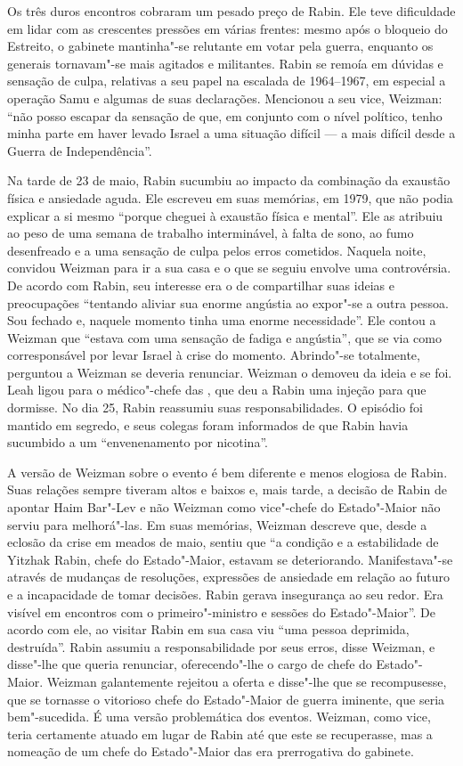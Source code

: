 Os três duros encontros cobraram um pesado preço de Rabin. Ele teve
dificuldade em lidar com as crescentes pressões em várias frentes: mesmo
após o bloqueio do Estreito, o gabinete mantinha"-se relutante em votar
pela guerra, enquanto os generais tornavam"-se mais agitados e
militantes. Rabin se remoía em dúvidas e sensação de culpa,
relativas a seu papel na escalada de 1964--1967, em especial a operação
Samu e algumas de suas declarações. Mencionou a seu vice,
Weizman: ``não posso escapar da sensação de que, em conjunto com o nível
político, tenho minha parte em haver levado Israel a uma situação
difícil --- a mais difícil desde a Guerra de Independência''.

Na tarde de 23 de maio, Rabin sucumbiu ao impacto da combinação da
exaustão física e ansiedade aguda. Ele escreveu em suas memórias, em 1979,
que não podia explicar a si mesmo ``porque cheguei à exaustão física e
mental''. Ele as atribuiu ao peso de uma semana de trabalho
interminável, à falta de sono, ao fumo desenfreado e a uma sensação de
culpa pelos erros cometidos. Naquela noite, convidou Weizman para ir a
sua casa e o que se seguiu envolve uma controvérsia. De acordo
com Rabin, seu interesse era o de compartilhar suas ideias e
preocupações ``tentando aliviar sua enorme angústia ao expor"-se a outra
pessoa. Sou fechado e, naquele momento tinha uma enorme necessidade''.
Ele contou a Weizman que ``estava com uma sensação de fadiga e
angústia'', que se via como corresponsável por levar Israel à crise do
momento. Abrindo"-se totalmente, perguntou a Weizman se deveria renunciar.
Weizman o demoveu da ideia e se foi. Leah ligou para o médico"-chefe das
, que deu a Rabin uma injeção para que dormisse. No dia 25, Rabin
reassumiu suas responsabilidades. O episódio foi mantido em segredo, e
seus colegas foram informados de que Rabin havia sucumbido a um
``envenenamento por nicotina''.

A versão de Weizman sobre o evento é bem diferente e menos elogiosa de
Rabin. Suas relações sempre tiveram altos e baixos e, mais tarde, a
decisão de Rabin de apontar Haim Bar"-Lev e não Weizman como vice"-chefe
do Estado"-Maior não serviu para melhorá"-las. Em suas memórias, Weizman
descreve que, desde a eclosão da crise em meados de maio, sentiu que
``a condição e a estabilidade de Yitzhak Rabin, chefe do Estado"-Maior,
estavam se deteriorando. Manifestava"-se através de mudanças de resoluções,
expressões de ansiedade em relação ao futuro e a incapacidade de tomar
decisões. Rabin gerava insegurança ao seu redor. Era visível em
encontros com o primeiro"-ministro e sessões do Estado"-Maior''. De acordo
com ele, ao visitar Rabin em sua casa viu ``uma pessoa
deprimida, destruída''. Rabin assumiu a responsabilidade por seus erros,
disse Weizman, e disse"-lhe que queria renunciar, oferecendo"-lhe o cargo
de chefe do Estado"-Maior. Weizman galantemente rejeitou a oferta e
disse"-lhe que se recompusesse, que se tornasse o vitorioso chefe do
Estado"-Maior de guerra iminente, que seria bem"-sucedida. É uma versão
problemática dos eventos. Weizman, como vice, teria certamente atuado em
lugar de Rabin até que este se recuperasse, mas a nomeação de um chefe
do Estado"-Maior das  era prerrogativa do gabinete.

